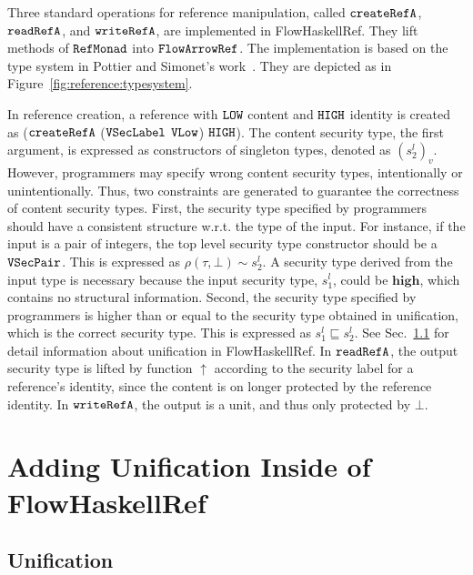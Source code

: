 \documentclass[a4paper]{report}
\newcommand{\co}[1]{$\cod{#1}$}
\newcommand{\sts}[1]{s_{#1}^l}
\newcommand{\is}{\sim}
\newcommand{\tagup}{\uparrow}
\newcommand{\typ}{\tau}
\begin{document}
Three standard operations for reference manipulation, called \co{createRefA}, \co{readRefA}, 
and \co{writeRefA}, are implemented in FlowHaskellRef. They lift methods of \co{RefMonad} into 
\co{FlowArrowRef}. 
The implementation is based on the type system in Pottier and Simonet's work~\cite{Pottier:Simonet:POPL02}.
They are depicted as in Figure~\ref{fig:reference:typesystem}.


In reference creation, a reference with \co{LOW} content and \co{HIGH} identity is created as
(\co{createRefA} (\co{VSecLabel} \co{VLow}) \co{HIGH}). 
The content security type, the first argument, is expressed as constructors of singleton types,
denoted as $(\sts{2})_v$.
However, programmers may specify wrong content security types, intentionally or unintentionally.
Thus, two constraints are generated to guarantee the correctness of content security types.
First, the security type specified by programmers should have a consistent structure w.r.t.
the type of the input. For instance, if the input is a pair of integers, the top level security type
constructor should be a \co{VSecPair}. 
This is expressed as $\rho(\typ,\bot) \is \sts{2}$. A security type derived from the input type is necessary
because the input security type, $\sts{1}$, could be $\mathbf{high}$, which contains no structural information.
Second, the security type specified by programmers is higher than
or equal to the security type obtained in unification, which is the correct security type.
This is expressed as $\sts{1} \sqsubseteq \sts{2}$. See Sec.~\ref{chap4:unification} for detail
information about unification in FlowHaskellRef.
In \co{readRefA}, the output security type is lifted by function $\tagup$ according to the security
label for a reference's identity,
since the content is on longer protected by the reference identity.
In \co{writeRefA}, the output is a unit, and thus only protected by $\bot$.


\chapter{Adding Unification Inside of FlowHaskellRef }


\section{Unification}
\label{chap4:unification}

\newcommand{\unify}[1]{\stackrel{{#1}}{\sim}}
\newcommand{\ct}{c^l}
\end{document}
